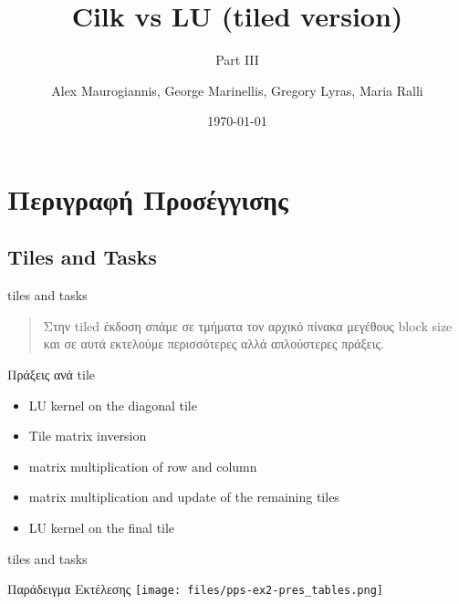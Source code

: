 \documentclass{beamer}
\author[afein,fedjo,mastergreg,mariaral]{Alex Maurogiannis, George Marinellis, Gregory Lyras, Maria Ralli}
\institute{CSlab @ NTUA}
\title{Cilk vs LU (tiled version)}
\subtitle{Part III}
\date{\today}
\begin{document}
\begin{frame}
    \titlepage
\end{frame}

\section{Περιγραφή Προσέγγισης}
\subsection{Tiles and Tasks}
\begin{frame}{tiles and tasks}
    \begin{quote}
        Στην tiled έκδοση σπάμε σε τμήματα τον αρχικό πίνακα μεγέθους block size
        και σε αυτά εκτελούμε περισσότερες αλλά απλούστερες πράξεις.
    \end{quote}
    \pause

    \begin{block}{Πράξεις ανά tile}
        \begin{itemize}
            \item<2-> LU kernel on the diagonal tile
            \item<3-> Tile matrix inversion
            \item<4-> matrix multiplication of row and column
            \item<5-> matrix multiplication and update of the remaining tiles
            \item<6-> LU kernel on the final tile
            
        \end{itemize}
    \end{block}

\end{frame}

\begin{frame}{tiles and tasks}
    \begin{block}{Παράδειγμα Εκτέλεσης}
        \texttt{[image: files/pps-ex2-pres\_tables.png]}
    \end{block}
\end{frame}
\end{document}
